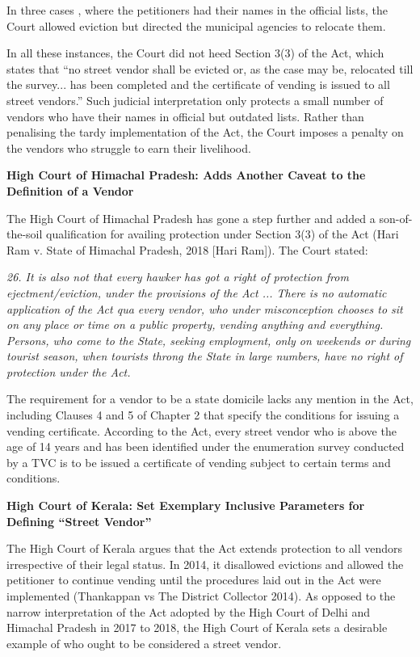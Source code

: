 \documentclass[a4paper, 12pt, twoside]{article}
\begin{document}
{In three cases , where the petitioners had their names in the official lists, the Court allowed eviction but directed the municipal agencies to relocate them.

In all these instances, the Court did not heed Section 3(3) of the Act, which states that “no street vendor shall be evicted or, as the case may be, relocated till the survey... has been completed and the certificate of vending is issued to all street vendors.” Such judicial interpretation only protects a small number of vendors who have their names in official but outdated lists. Rather than penalising the tardy implementation of the Act, the Court imposes a penalty on the vendors who struggle to earn their livelihood.

\textbf{High Court of Himachal Pradesh: Adds Another Caveat to the Definition of a Vendor}

The High Court of Himachal Pradesh has gone a step further and added a son-of-the-soil qualification for availing protection under Section 3(3) of the Act (Hari Ram v. State of Himachal Pradesh, 2018 [Hari Ram]). The Court stated:

\textit{26. It is also not that every hawker has got a right of protection from ejectment/eviction, under the provisions of the Act ... There is no automatic application of the Act qua every vendor, who under misconception chooses to sit on any place or time on a public property, vending anything and everything. Persons, who come to the State, seeking employment, only on weekends or during tourist season, when tourists throng the State in large numbers, have no right of protection under the Act.}

The requirement for a vendor to be a state domicile lacks any mention in the Act, including Clauses 4 and 5 of Chapter 2 that specify the conditions for issuing a vending certificate. According to the Act, every street vendor who is above the age of 14 years and has been identified under the enumeration survey conducted by a TVC is to be issued a certificate of vending subject to certain terms and conditions.

\textbf{High Court of Kerala: Set Exemplary Inclusive Parameters for Defining “Street Vendor”}

The High Court of Kerala argues that the Act extends protection to all vendors irrespective of their legal status. In 2014, it disallowed evictions and allowed the petitioner to continue vending until the procedures laid out in the Act were implemented (Thankappan vs The District Collector 2014). As opposed to the narrow interpretation of the Act adopted by the High Court of Delhi and Himachal Pradesh in 2017 to 2018, the High Court of Kerala sets a desirable example of who ought to be considered a street vendor.

}
\end{document}
